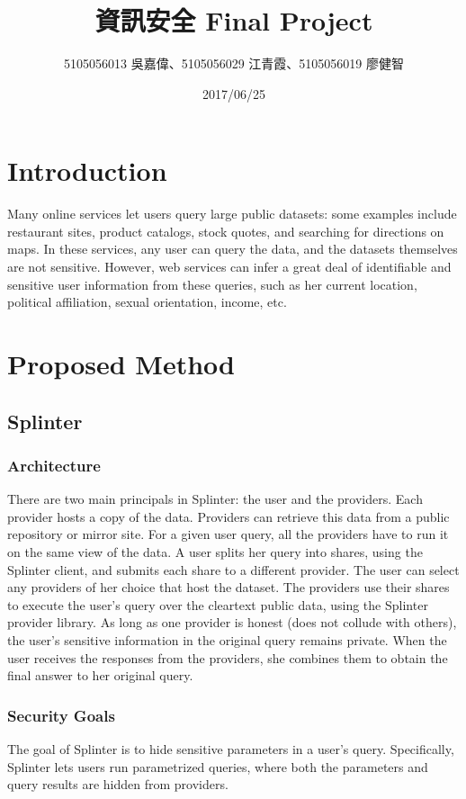 \documentclass[12pt,a4paper]{article}
\title{\huge 資訊安全 Final Project} %
\author{5105056013 吳嘉偉、5105056029 江青霞、5105056019 廖健智} %
\date{2017/06/25} %
\begin{document}
\clearpage
\maketitle %

\begin{multicols}{2}

\section{Introduction}
Many online services let users query large public 
datasets: some examples include restaurant sites, 
product catalogs, stock quotes, and searching for 
directions on maps. In these services, any user can 
query the data, and the datasets themselves are not 
sensitive. However, web services can infer a great 
deal of identifiable and sensitive user information 
from these queries, such as her current location, 
political affiliation, sexual orientation, income, 
etc.
		
\section{Proposed Method}
\subsection{Splinter}
\subsubsection{Architecture}
There are two main principals in Splinter: the user 
and the providers. Each provider hosts a copy of 
the data. Providers can retrieve this data from a 
public repository or mirror site. For a given user 
query, all the providers have to run it on the same 
view of the data. 
  A user splits her query into shares, using the 
Splinter client, and submits each share to a 
different provider. The user can select any 
providers of her choice that host the dataset. The 
providers use their shares to execute the user’s 
query over the cleartext public data, using the 
Splinter provider library. As long as one provider 
is honest (does not collude with others), the 
user’s sensitive information in the original query 
remains private. When the user receives the 
responses from the providers, she combines them to 
obtain the final answer to her original query.

\subsubsection{Security Goals}
The goal of Splinter is to hide sensitive 
parameters in a user's query. Specifically, 
Splinter lets users run parametrized queries, where 
both the parameters and query results are hidden 
from providers.


\end{multicols}
\end{document}
